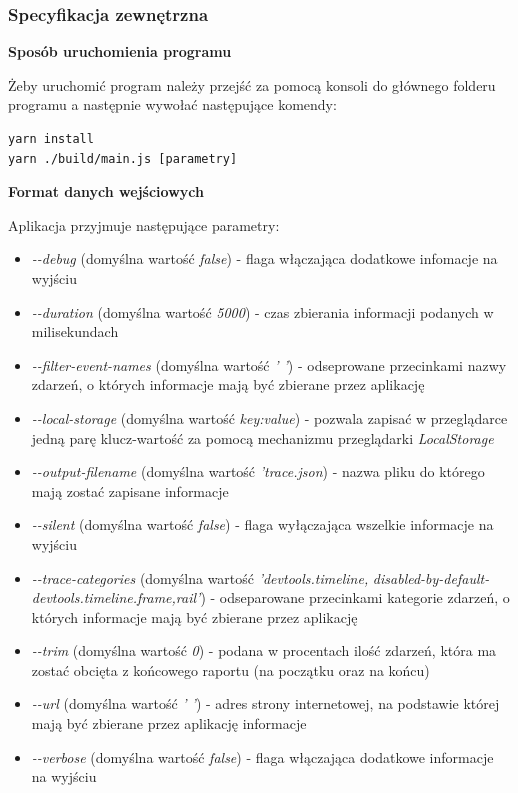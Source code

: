 \documentclass[polish, twoside, 12pt]{mwart}
\begin{document}
\subsubsection{Specyfikacja zewnętrzna}

\textbf{Sposób uruchomienia programu} \newline

Żeby uruchomić program należy przejść za pomocą konsoli do głównego folderu programu a następnie wywołać następujące komendy:

\begin{lstlisting}
yarn install
yarn ./build/main.js [parametry]
\end{lstlisting}

\textbf{Format danych wejściowych} \newline

Aplikacja przyjmuje następujące parametry:

\begin{itemize}
  \item \emph{-{}-debug} (domyślna wartość \emph{false}) - flaga włączająca dodatkowe infomacje na wyjściu
  \item \emph{-{}-duration} (domyślna wartość \emph{5000}) - czas zbierania informacji podanych w milisekundach
  \item \emph{-{}-filter-event-names} (domyślna wartość \emph{' '}) - odseprowane przecinkami nazwy zdarzeń, o których informacje mają być zbierane przez aplikację
  \item \emph{-{}-local-storage} (domyślna wartość \emph{key:value}) - pozwala zapisać w przeglądarce jedną parę klucz-wartość za pomocą mechanizmu przeglądarki \emph{LocalStorage}
  \item \emph{-{}-output-filename} (domyślna wartość \emph{'trace.json}) - nazwa pliku do którego mają zostać zapisane informacje
  \item \emph{-{}-silent} (domyślna wartość \emph{false}) - flaga wyłączająca wszelkie informacje na wyjściu
  \item \emph{-{}-trace-categories} (domyślna wartość \emph{'devtools.timeline,} \newline \emph{disabled-by-default-devtools.timeline.frame,rail'}) - odseparowane przecinkami kategorie zdarzeń, o których informacje mają być zbierane przez aplikację
  \item \emph{-{}-trim} (domyślna wartość \emph{0}) - podana w procentach ilość zdarzeń, która ma zostać obcięta z końcowego raportu (na początku oraz na końcu)
  \item \emph{-{}-url} (domyślna wartość \emph{' '}) - adres strony internetowej, na podstawie której mają być zbierane przez aplikację informacje
  \item \emph{-{}-verbose} (domyślna wartość \emph{false}) - flaga włączająca dodatkowe informacje na wyjściu
\end{itemize}
\end{document}
